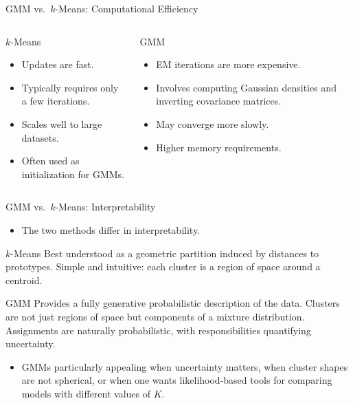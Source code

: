 \begin{frame}{GMM vs.\ $k$-Means: Computational Efficiency}
  \begin{columns}[t]
      \begin{block}{$k$-Means}
        \begin{itemize}
          \item Updates are \alert{fast}.
          \item Typically requires only a few iterations.
          \item Scales well to large datasets.
          \item Often used as initialization for GMMs.
        \end{itemize}
      \end{block}
      \begin{block}{GMM}
        \begin{itemize}
          \item EM iterations are \alert{more expensive}.
          \item Involves computing Gaussian densities and inverting covariance matrices.
          \item May converge more slowly.
          \item Higher memory requirements.
        \end{itemize}
      \end{block}
  \end{columns}
\end{frame}

\begin{frame}{GMM vs.\ $k$-Means: Interpretability}
  \begin{itemize}
    \item The two methods differ in interpretability.
  \end{itemize}
  \begin{block}{$k$-Means}
    Best understood as a \alert{geometric partition} induced by distances to prototypes.
    Simple and intuitive: each cluster is a region of space around a centroid.
  \end{block}
  \begin{block}{GMM}
    Provides a fully \alert{generative probabilistic description} of the data. Clusters
    are not just regions of space but components of a mixture distribution. Assignments are
    naturally probabilistic, with responsibilities quantifying uncertainty.
  \end{block}
  \vspace{0.4em}
  \begin{itemize}
    \item GMMs particularly appealing when uncertainty matters, when cluster shapes are
          not spherical, or when one wants likelihood-based tools for comparing models with
          different values of $K$.
  \end{itemize}
\end{frame}

